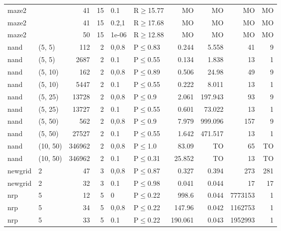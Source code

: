 \begin{longtable}{llrrllrrrr}
 maze2         &          &     	41 &  15 & 0.1   & R$\geq$15.77 & MO      & MO      & MO      & MO   \\
 maze2         &          &     	41 &  15 & 0.2,1 & R$\geq$17.68 & MO      & MO      & MO      & MO   \\
 maze2         &          &     	50 &  15 & 1e-06 & R$\geq$12.88 & MO      & MO      & MO      & MO   \\
 nand          & (5, 5)   &    	112 &   2 & 0,0.8 & P$\leq$0.83  & 0.244   & 5.558   & 41      & 9    \\
 nand          & (5, 5)   &   	2687 &   2 & 0.1   & P$\leq$0.55  & 0.134   & 1.838   & 13      & 1    \\
 nand          & (5, 10)  &    	162 &   2 & 0,0.8 & P$\leq$0.89  & 0.506   & 24.98   & 49      & 9    \\
 nand          & (5, 10)  &   	5447 &   2 & 0.1   & P$\leq$0.55  & 0.222   & 8.011   & 13      & 1    \\
 nand          & (5, 25)  &  	13728 &   2 & 0,0.8 & P$\leq$0.9   & 2.061   & 197.943 & 93      & 9    \\
 nand          & (5, 25)  &  	13727 &   2 & 0.1   & P$\leq$0.55  & 0.601   & 73.022  & 13      & 1    \\
 nand          & (5, 50)  &    	562 &   2 & 0,0.8 & P$\leq$0.9   & 7.979   & 999.096 & 157     & 9    \\
 nand          & (5, 50)  &  	27527 &   2 & 0.1   & P$\leq$0.55  & 1.642   & 471.517 & 13      & 1    \\
 nand          & (10, 50) & 	346962 &   2 & 0,0.8 & P$\leq$1.0   & 83.09   & TO      & 65      & TO   \\
 nand          & (10, 50) & 	346962 &   2 & 0.1   & P$\leq$0.31  & 25.852  & TO      & 13      & TO   \\
 newgrid       & 2        &     	47 &   3 & 0,0.8 & P$\leq$0.87  & 0.327   & 0.394   & 273     & 281  \\
 newgrid       & 2        &     	32 &   3 & 0.1   & P$\leq$0.98  & 0.041   & 0.044   & 17      & 17   \\
 nrp           & 5        &     	12 &   5 & 0     & P$\leq$0.22  & 998.6   & 0.044   & 7773153 & 1    \\
 nrp           & 5        &     	34 &   5 & 0,0.8 & P$\leq$0.22  & 147.96  & 0.042   & 1162753 & 1    \\
 nrp           & 5        &     	33 &   5 & 0.1   & P$\leq$0.22  & 190.061 & 0.043   & 1952993 & 1    \\

\end{longtable}
